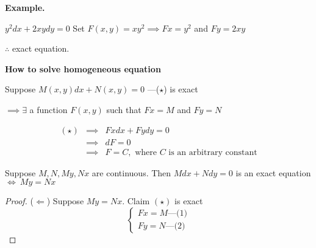 \textbf{Example.}

$y^2 dx + 2xy dy = 0$ Set $F(x,y) = xy^2 \implies Fx = y^2$ and $Fy = 2xy$

$\therefore$ exact equation.

\textbf{How to solve homogeneous equation}

Suppose $M(x,y)dx + N(x,y) = 0$ ---($\star$) is exact

$\implies \exists$ a function $F(x,y)$ such that $Fx = M$ and $Fy = N$

\begin{eqnarray*}
	(\star) &\implies& Fxdx + Fydy = 0\\
	&\implies& dF = 0\\
	&\implies& F = C, \text{ where $C$ is an arbitrary constant}
\end{eqnarray*}

\begin{thm*}
	Suppose $M,N,My,Nx$ are continuous. Then $Mdx + Ndy = 0$ is an exact equation $\Leftrightarrow ~ My = Nx$
\end{thm*}

\begin{proof}
	($\Leftarrow$) Suppose $My = Nx$. Claim $(\star)$ is exact
	$$\begin{cases}
		Fx = M \text{---(1)}\\
		Fy = N \text{---(2)}
	\end{cases}$$
\end{proof}













